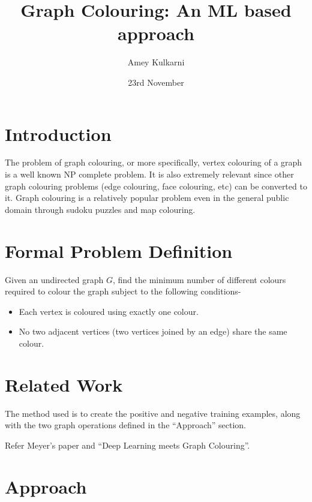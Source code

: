 \documentclass[a4paper]{report}
\title{Graph Colouring: An ML based approach}
\date{23rd November}
\author{Amey Kulkarni}
\begin{document}
\maketitle
\section{Introduction}
The problem of graph colouring, or more specifically, vertex colouring of a graph
is a well known NP complete problem. It is also extremely relevant since other
graph colouring problems (edge colouring, face colouring, etc) can be converted
to it. Graph colouring is a relatively popular problem even in the general
public domain through sudoku puzzles and map colouring.
\section{Formal Problem Definition}
Given an undirected graph $G$, find the minimum number of different colours required to colour the graph
subject to the following conditions-
\begin{itemize}
    \item Each vertex is coloured using exactly one colour.
    \item No two adjacent vertices (two vertices joined by an edge) share the
        same colour.
\end{itemize}
\section{Related Work}
The method used is to create the positive and negative training examples, along
with the two graph operations defined in the ``Approach'' section.

Refer Meyer's paper and ``Deep Learning meets Graph Colouring''.
\section{Approach}
\end{document}
